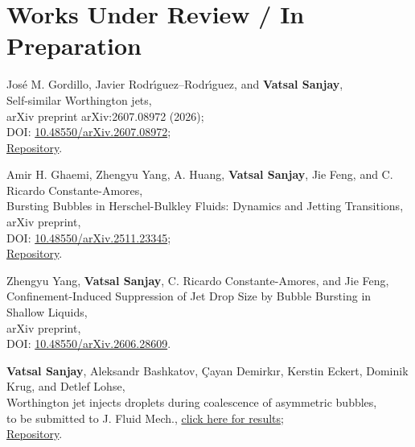 \documentclass[10pt,a4paper,colorlinks,linkcolor=blue,urlcolor=blue,citecolor=blue]{moderncv}
\begin{document}
\section{Works Under Review / In Preparation}
\begin{enumerate}[leftmargin=1.5em,label=\textbf{[\arabic*]}]
	\item Jos\'e M. Gordillo, Javier Rodr\'{\i}guez--Rodr\'{\i}guez, and \textbf{Vatsal Sanjay},\\
	Self-similar Worthington jets,\\
	arXiv preprint arXiv:2607.08972 (2026);\\
	\faFile\hspace{0.2em}DOI: \href{https://doi.org/10.48550/arXiv.2607.08972}{10.48550/arXiv.2607.08972};\\
	\faGithub\hspace{0.2em}\href{https://github.com/comphy-lab/Bursting-Bubble}{Repository}.

	\item Amir H. Ghaemi, Zhengyu Yang, A. Huang, \textbf{Vatsal Sanjay}, Jie Feng, and C. Ricardo Constante-Amores,\\
	Bursting Bubbles in Herschel-Bulkley Fluids: Dynamics and Jetting Transitions,\\
	arXiv preprint,\\
	\faFile\hspace{0.2em}DOI: \href{https://doi.org/10.48550/arXiv.2511.23345}{10.48550/arXiv.2511.23345};\\
	\faGithub\hspace{0.2em}\href{https://github.com/comphy-lab/BurstingBubble_Herschel-Bulkley}{Repository}.


	\item Zhengyu Yang, \textbf{Vatsal Sanjay}, C. Ricardo Constante-Amores, and Jie Feng,\\
	Confinement-Induced Suppression of Jet Drop Size by Bubble Bursting in Shallow Liquids,\\
	arXiv preprint,\\
	\faFile\hspace{0.2em}DOI: \href{https://doi.org/10.48550/arXiv.2606.28609}{10.48550/arXiv.2606.28609}.

	\item \textbf{Vatsal Sanjay}, Aleksandr Bashkatov, Çayan Demirkır, Kerstin Eckert, Dominik Krug, and Detlef Lohse,\\
	Worthington jet injects droplets during coalescence of asymmetric bubbles,\\
	to be submitted to J. Fluid Mech., \href{https://youtu.be/WZonMHzzkXQ}{click here for results};\\
	\faGithub\hspace{0.2em}\href{https://github.com/VatsalSy/Asymmetries-in-coalescence}{Repository}.


\end{enumerate}
\end{document}
